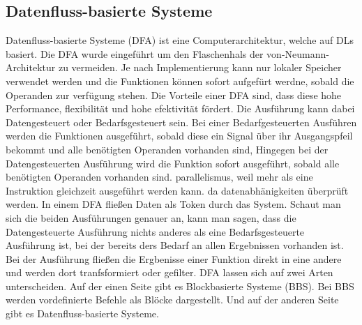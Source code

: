 \documentclass{article}
\begin{document}
    \subsection{Datenfluss-basierte Systeme}
    Datenfluss-basierte Systeme (DFA) ist eine Computerarchitektur, welche auf DLs basiert. 
    Die DFA wurde eingeführt um den Flaschenhals der von-Neumann-Architektur zu vermeiden. Je nach Implementierung kann nur lokaler Speicher verwendet werden und die Funktionen können sofort aufgefürt werdne, sobald die Operanden zur verfügung stehen. \cite{8}
    Die Vorteile einer DFA sind, dass diese hohe Performance, flexibilität und hohe efektivität fördert. \cite{1}
    Die Ausführung kann dabei Datengesteuert oder Bedarfsgesteuert sein. Bei einer Bedarfgesteuerten Ausführen werden die Funktionen ausgeführt, sobald diese ein Signal über ihr Ausgangspfeil bekommt und alle benötigten Operanden vorhanden sind, Hingegen bei der Datengesteuerten Ausführung wird die Funktion sofort ausgeführt, sobald alle benötigten Operanden vorhanden sind. \cite{2}
    parallelismus, weil mehr als eine Instruktion gleichzeit ausgeführt werden kann. da datenabhänigkeiten überprüft werden. 
    In einem DFA fließen Daten als Token durch das System.
    Schaut man sich die beiden Ausführungen genauer an, kann man sagen, dass die Datengesteuerte Ausführung nichts anderes als eine Bedarfsgesteuerte Ausführung ist, bei der bereits ders Bedarf an allen Ergebnissen vorhanden ist.\cite{11}
    Bei der Ausführung fließen die Ergbenisse einer Funktion direkt in eine andere und werden dort tranfsformiert oder gefilter. \cite{15}
    DFA lassen sich auf zwei Arten unterscheiden. Auf der einen Seite gibt es Blockbasierte Systeme (BBS). Bei BBS werden vordefinierte Befehle als Blöcke dargestellt. \cite{20}
    Und auf der anderen Seite gibt es Datenfluss-basierte Systeme.
    \newpage
\end{document}
